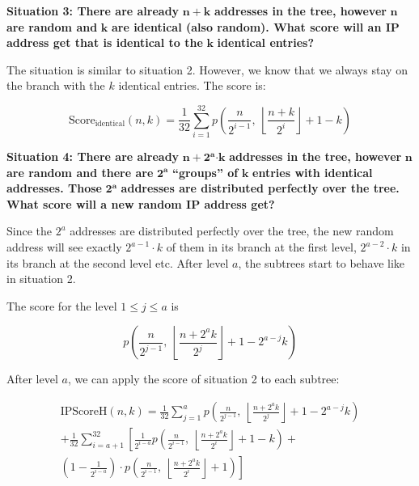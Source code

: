 \textbf{Situation 3: There are already} \(\mathbf{n + k}\)
\textbf{addresses in the tree, however} \(\mathbf{n}\) \textbf{are
random and} \(\mathbf{k}\) \textbf{are identical (also random). What
score will an IP address get that is identical to the} \(\mathbf{k}\)
\textbf{identical entries?}

The situation is similar to situation 2. However, we know that we always
stay on the branch with the \(k\) identical entries. The score is:

\[\text{Score}_{\text{identical}}(n,k) = \frac{1}{32} \sum_{i = 1}^{32}{p\left( \frac{n}{2^{i - 1}},\ \left\lfloor \frac{n + k}{2^{i}} \right\rfloor + 1 - k \right)}\]

\textbf{Situation 4: There are already}
\(\mathbf{n +}\mathbf{2}^{\mathbf{a}}\mathbf{\cdot k}\)
\textbf{addresses in the tree, however} \(\mathbf{n}\) \textbf{are
random and there are} \(\mathbf{2}^{\mathbf{a}}\) \textbf{``groups'' of}
\(\mathbf{k}\) \textbf{entries with identical addresses. Those}
\(\mathbf{2}^{\mathbf{a}}\) \textbf{addresses are distributed perfectly
over the tree. What score will a new random IP address get?}

Since the \(2^{a}\) addresses are distributed perfectly over the tree,
the new random address will see exactly \(2^{a - 1} \cdot k\) of them in
its branch at the first level, \(2^{a - 2} \cdot k\) in its branch at
the second level etc. After level \(a\), the subtrees start to behave
like in situation 2.

The score for the level \(1 \leq j \leq a\) is

\[p\left( \frac{n}{2^{j - 1}},\ \left\lfloor \frac{n + 2^{a}k}{2^{j}} \right\rfloor + 1 - 2^{a - j}k \right)\]

After level \(a\), we can apply the score of situation 2 to each
subtree:

\[
\begin{split}
{\text{IPScoreH}(n,k) = \frac{1}{32}\sum_{j = 1}^{a}{p\left( \frac{n}{2^{j - 1}},\ \left\lfloor \frac{n + 2^{a}k}{2^{j}} \right\rfloor + 1 - 2^{a - j}k \right)}
}\\
+ \frac{1}{32}\sum_{i = a + 1}^{32}\left\lbrack \frac{1}{2^{i - a}}p\left( \frac{n}{2^{i - 1}},\ \left\lfloor \frac{n + 2^{a}k}{2^{i}} \right\rfloor + 1 - k \right)+\right.\\
\left.\left( 1 - \frac{1}{2^{i - a}} \right) \cdot p\left( \frac{n}{2^{i - 1}},\ \left\lfloor \frac{n + 2^{a}k}{2^{i}} \right\rfloor + 1 \right) \right\rbrack
\end{split}
\]

